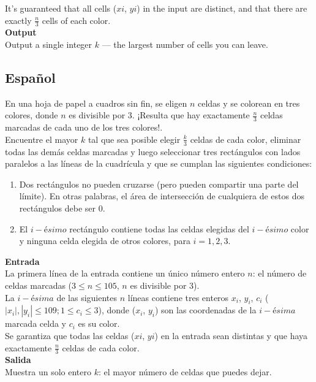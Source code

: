 \documentclass[12pt, a4paper]{article}
\begin{document}
		It's guaranteed that all cells ($xi$, $yi$) in the input are distinct, and that there are exactly $\frac{n}{3}$ cells of each color.\\

		{\bf Output}\\

		Output a single integer $k$ — the largest number of cells you can leave.\\
		\newpage

	\subsection{Español}
	En una hoja de papel a cuadros sin fin, se eligen $n$ celdas y se colorean en tres colores, donde $n$ es divisible por $3$. ¡Resulta que hay exactamente $\frac{n}{3}$ celdas marcadas de cada uno de los tres colores!.\\

	Encuentre el mayor $k$ tal que sea posible elegir $\frac{k}{3}$ celdas de cada color, eliminar todas las demás celdas marcadas y luego seleccionar tres rectángulos con lados paralelos a las líneas de la cuadrícula y que se cumplan las siguientes condiciones:\\

	\begin{enumerate}
		\item Dos rectángulos no pueden cruzarse (pero pueden compartir una parte del límite). En otras palabras, el área de intersección de cualquiera de estos dos rectángulos debe ser $0$.\\

		\item El $i-ésimo$ rectángulo contiene todas las celdas elegidas del $i-ésimo$ color y ninguna celda elegida de otros colores, para $i=1,2,3$.\\
	\end{enumerate}
	
		{\bf Entrada}\\
		La primera línea de la entrada contiene un único número entero $n$: el número de celdas marcadas ($3 \le n \le 105$, $n$ es divisible por $3$).\\

		La $i-ésima$ de las siguientes $n$ líneas contiene tres enteros $x_i$, $y_i$, $c_i$ ($|x_i|, |y_i| \le 109; 1 \le c_i \le 3$), donde ($x_i$, $y_i$) son las coordenadas de la $i-ésima$ marcada celda y $c_i$ es su color.\\

		Se garantiza que todas las celdas ($xi$, $yi$) en la entrada sean distintas y que haya exactamente $\frac{n}{3}$ celdas de cada color.\\

		{\bf Salida}\\
		Muestra un solo entero $k$: el mayor número de celdas que puedes dejar.\\
\end{document}
